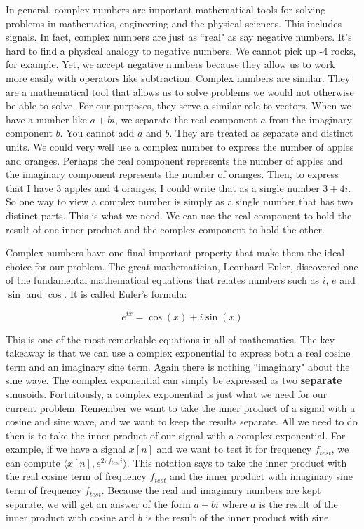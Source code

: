 In general, complex numbers are important mathematical tools for solving problems in mathematics, engineering and
the physical sciences.  This includes signals.  In fact, complex numbers are just as ``real" as say negative numbers.
It's hard to find a physical analogy to negative numbers.  We cannot pick up -4 rocks, for example.  Yet, we 
accept negative numbers because they allow us to work more easily with operators like subtraction.  Complex
numbers are similar.  They are a mathematical tool that allows us to solve problems we would not otherwise be
able to solve.  For our purposes, they serve a similar role to vectors.  When we have a number like $a + bi$, we
separate the real component $a$ from the imaginary component $b$.  You cannot add $a$ and $b$.  They are treated
as separate and distinct units.  We could very well use a complex number to express the number of apples and 
oranges.  Perhaps the real component represents the number of apples and the imaginary component represents
the number of oranges.  Then, to express that I have 3 apples and 4 oranges, I could write that as a single number
$3 + 4i$.  So one way to view a complex number is simply as a single number that has two distinct parts.  This
is what we need.  We can use the real component to hold the result of one inner product and the complex 
component to hold the other.

Complex numbers have one final important property that make them the ideal choice for our problem.  The great 
mathematician, Leonhard Euler, discovered one of the fundamental mathematical equations
that relates numbers such as $i$, $e$ and $\sin$ and $\cos$.  It is called Euler's formula:

\begin{equation}
\label{eq:euler}
e^{ix} = \cos(x) + i\sin(x)
\end{equation}

This is one of the most remarkable equations in all of mathematics.  The key takeaway is that we can use
a complex exponential to express both a real cosine term and an imaginary sine term.  Again there is
nothing ``imaginary" about the sine wave.  The complex exponential can simply be expressed as two 
\textbf{separate} sinusoids.  Fortuitously, a complex exponential is just what we need for our current
problem.  Remember we want to take the inner product of a signal with a cosine and sine wave, and we want to 
keep the results separate.  All we need to do then is to take the inner product of our signal with a complex
exponential.  For example, if we have a signal $x[n]$ and
we want to test it for frequency $f_{test}$, we can compute $\langle x[n], e^{2\pi f_{test}i}\rangle$.  This
notation says to take the inner product with the real cosine term of frequency $f_{test}$ and the inner
product with imaginary sine term of frequency $f_{test}$.  Because the real and imaginary numbers are kept
separate, we will get an answer of the form $a + bi$ where $a$ is the result of the inner product with cosine
and $b$ is the result of the inner product with sine. 

